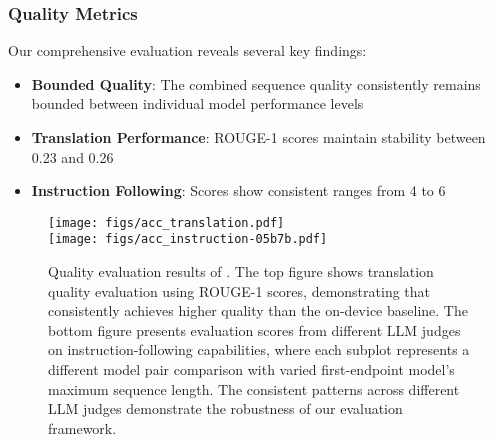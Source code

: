 \subsubsection{Quality Metrics}
Our comprehensive evaluation reveals several key findings:
\begin{itemize}
    \item \textbf{Bounded Quality}: The combined sequence quality consistently remains bounded between individual model performance levels
    \item \textbf{Translation Performance}: ROUGE-1 scores maintain stability between 0.23 and 0.26
    \item \textbf{Instruction Following}: Scores show consistent ranges from 4 to 6
\end{itemize}

\begin{figure}[t]
    \centering
    \texttt{[image: figs/acc\_translation.pdf]}
    \\[12pt]
    \texttt{[image: figs/acc\_instruction-05b7b.pdf]}
    \caption{Quality evaluation results of \disco{}. The top figure shows translation quality evaluation using ROUGE-1 scores, demonstrating that \disco{} consistently achieves higher quality than the on-device baseline. The bottom figure presents evaluation scores from different LLM judges on instruction-following capabilities, where each subplot represents a different model pair comparison with varied first-endpoint model's maximum sequence length. The consistent patterns across different LLM judges demonstrate the robustness of our evaluation framework.}
    \label{fig:accuracy}
\end{figure}
